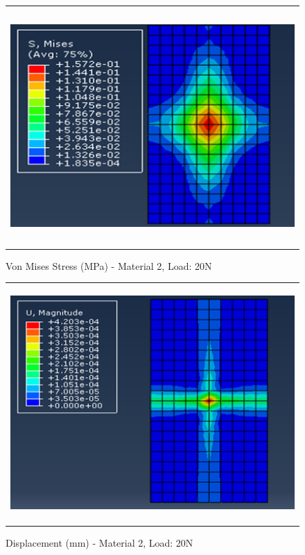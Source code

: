 \documentclass[a4paper,12pt]{article}
\numberwithin{equation}{section}
\numberwithin{figure}{section}
\begin{document}
\begin{figure}[H]
  \centering
  \begin{tabular}{@{}c@{}}
    \includegraphics[width=0.7\linewidth,height=255pt]{Results/Point Loading/M2_VMS_L4.png} \\
  \end{tabular}
  \caption{Von Mises Stress (MPa) - Material 2, Load: 20N}
\end{figure}

\begin{figure}[H]
  \centering
  \begin{tabular}{@{}c@{}}
    \includegraphics[width=0.7\linewidth,height=255pt]{Results/Point Loading/M2_DIS_L4.png} \\
  \end{tabular}
  \caption{Displacement (mm) - Material 2, Load: 20N}
\end{figure}
\end{document}

